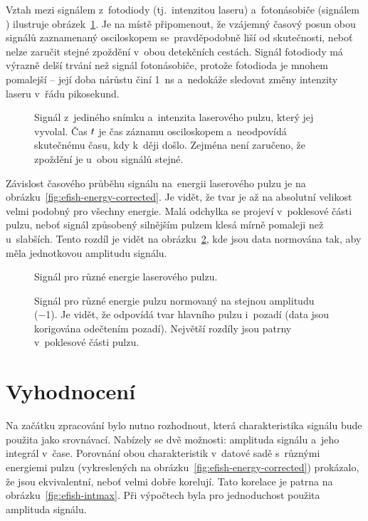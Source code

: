 Vztah mezi signálem z~fotodiody (tj.~intenzitou laseru)
a~fotonásobiče (signálem \EFISH{}) ilustruje
obrázek~\ref{fig:efish-singleshot}.
Je na místě připomenout, že vzájemný časový posun obou signálů
zaznamenaný osciloskopem se~pravděpodobně liší od skutečnosti,
neboť nelze zaručit stejné zpoždění v~obou detekčních cestách.
Signál fotodiody má výrazně delší trvání než signál fotonásobiče,
protože fotodioda je mnohem pomalejší -- její doba nárůstu činí
\SI{1}{\nano\second}
a~nedokáže sledovat změny intenzity laseru v~řádu pikosekund.
\autocite{thorlabs-fd-datasheet}

\begin{figure}[p]
	\centering
	
	\caption{Signál \EFISH{} z~jediného snímku
		a~intenzita laserového pulzu, který jej vyvolal.
		Čas $t$ je čas záznamu osciloskopem a~neodpovídá skutečnému času,
		kdy k~ději došlo.
		Zejména není zaručeno, že zpoždění je u~obou signálů stejné.}
	\label{fig:efish-singleshot}
\end{figure}

Závislost časového průběhu signálu \EFISH{} na~energii laserového pulzu
je na obrázku~\ref{fig:efish-energy-corrected}.
Je vidět, že tvar je až na absolutní velikost velmi podobný pro všechny
energie.
Malá odchylka se projeví v~poklesové části pulzu, neboť signál způsobený
silnějším pulzem klesá mírně pomaleji než u~slabších.
Tento rozdíl je vidět na obrázku~\ref{fig:efish-energy-norm},
kde jsou data normována tak, aby měla jednotkovou amplitudu signálu.

\begin{figure}[p]
	\centering
	
	\caption{Signál \EFISH{} pro různé energie laserového pulzu.}
	\label{fig:efish-energy-corrected}
	\vspace{24pt}
	
	\caption{Signál \EFISH{} pro různé energie pulzu normovaný na stejnou
		amplitudu (\num{-1}).
		Je vidět, že odpovídá tvar hlavního pulzu i~pozadí
		(data jsou korigována odečtením pozadí).
		Největší rozdíly jsou patrny v~poklesové části pulzu.}
	\label{fig:efish-energy-norm}
\end{figure}

\section{Vyhodnocení}
\label{sec:efish-method}
Na začátku zpracování bylo nutno rozhodnout, která charakteristika signálu
\EFISH{} bude použita jako srovnávací.
Nabízely se dvě možnosti: amplituda signálu a~jeho integrál v~čase.
Porovnání obou charakteristik v~datové sadě s~různými energiemi pulzu
(vykreslených na obrázku~\ref{fig:efish-energy-corrected}) prokázalo,
že jsou ekvivalentní, neboť velmi dobře korelují.
Tato korelace je patrna na obrázku~\ref{fig:efish-intmax}.
Při výpočtech byla pro jednoduchost použita amplituda signálu.


